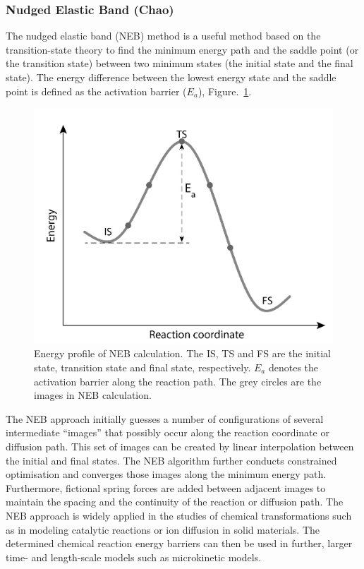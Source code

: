 \documentclass[../main.tex]{subfiles}
\begin{document}
\subsubsection{Nudged Elastic Band (Chao)} 
\label{sec:methods_neb}

The nudged elastic band (NEB) method is a useful method based on the transition-state theory to find the minimum energy path and the saddle point (or the transition state) between two minimum states (the initial state and the final state).\cite{henkelman2000climbing,henkelman2000improved} The energy difference between the lowest energy state and the saddle point is defined as the activation barrier ($E_a$), Figure.~\ref{fig:NEB_profile}. \cite{henkelman2000improved}

\begin{figure}
    \centering
    \includegraphics[scale=0.6]{figures/NEB_profile.png}
    \caption{Energy profile of NEB calculation. The IS, TS and FS are the initial state, transition state and final state, respectively. $E_a$ denotes the activation barrier along the reaction path. The grey circles are the images in NEB calculation.}
    \label{fig:NEB_profile}
\end{figure}

The NEB approach initially guesses a number of configurations of several intermediate ``images'' that possibly occur along the reaction coordinate or diffusion path. This set of images can be created by linear interpolation between the initial and final states. The NEB algorithm further conducts constrained optimisation and converges those images along the minimum energy path. Furthermore, fictional spring forces are added between adjacent images to maintain the spacing and the continuity of the reaction or diffusion path. The NEB approach is widely applied in the studies of chemical transformations such as in modeling catalytic reactions or ion diffusion in solid materials. The determined chemical reaction energy barriers can then be used in further, larger time- and length-scale models such as  microkinetic models.\cite{peng2020lithium,Mercer2021}
\end{document}
